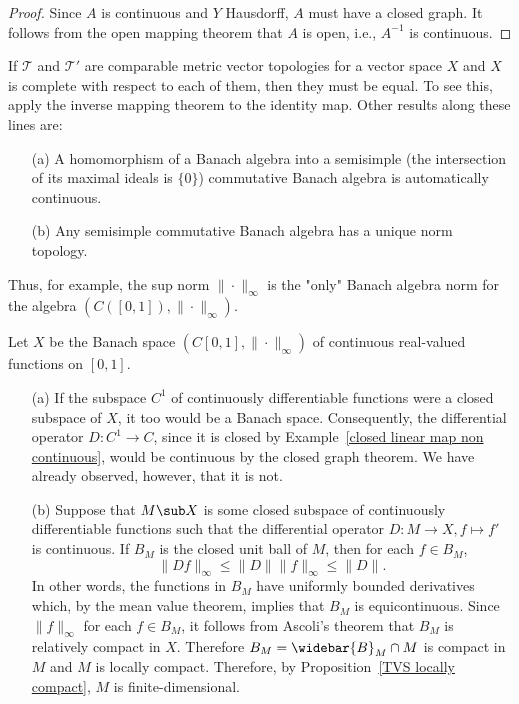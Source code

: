\begin{proof}
Since $A$ is continuous and $Y$ Hausdorff, $A$ must have a closed graph. It follows from the open mapping theorem that $A$ is open, i.e., $A^{-1}$ is continuous.
\end{proof}
If $\mathcal{T}$ and $\mathcal{T}'$ are comparable metric vector topologies for a vector space $X$ and $X$ is complete with respect to each of them, then they must be equal. To see this, apply the inverse mapping theorem to the identity map. Other results along these lines are:
\begin{itemize}
\item[(a)] A homomorphism of a Banach algebra into a semisimple (the intersection of its maximal ideals is $\{0\}$) commutative Banach algebra is automatically continuous.
\item[(b)] Any semisimple commutative Banach algebra has a unique norm topology.
\end{itemize}
Thus, for example, the sup norm $\|\cdot\|_\infty$ is the "only" Banach algebra norm for the algebra $(C([0,1]),\|\cdot\|_\infty)$.
\begin{example}\label{C([0,1]) closed subspace}
Let $X$ be the Banach space $(C[0,1],\|\cdot\|_\infty)$ of continuous real-valued functions on $[0,1]$.
\begin{itemize}
\item[(a)] If the subspace $C^1$ of continuously differentiable functions were a closed subspace of $X$, it too would be a Banach space. Consequently, the differential operator $D:C^1\to C$, since it is closed by Example~\ref{closed linear map non continuous}, would be continuous by the closed graph theorem. We have already observed, however, that it is not.
\item[(b)] Suppose that $M\sub X$ is some closed subspace of continuously differentiable functions such that the differential operator $D:M\to X,f\mapsto f'$ is continuous. If $B_M$ is the closed unit ball of $M$, then for each $f\in B_M$,
\[\|Df\|_\infty\leq\|D\|\|f\|_\infty\leq\|D\|.\]
In other words, the functions in $B_M$ have uniformly bounded derivatives which, by the mean value theorem, implies that $B_M$ is equicontinuous. Since $\|f\|_\infty$ for each $f\in B_M$, it follows from Ascoli's theorem that $B_M$ is relatively compact in $X$. Therefore $B_M=\widebar{B}_M\cap M$ is compact in $M$ and $M$ is locally compact. Therefore, by Proposition~\ref{TVS locally compact}, $M$ is finite-dimensional.
\end{itemize}
\end{example}
